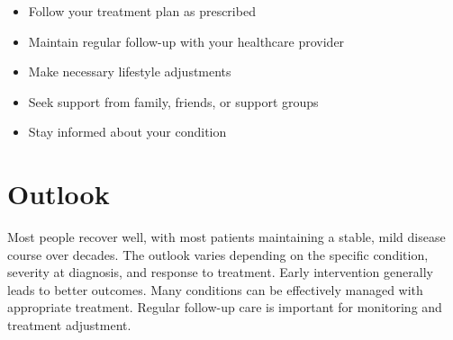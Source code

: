 \begin{itemize}[noitemsep]
  \item Follow your treatment plan as prescribed
  \item Maintain regular follow-up with your healthcare provider
  \item Make necessary lifestyle adjustments
  \item Seek support from family, friends, or support groups
  \item Stay informed about your condition
\end{itemize}
\section{Outlook}
Most people recover well, with most patients maintaining a stable, mild disease course over decades. The outlook varies depending on the specific condition, severity at diagnosis, and response to treatment. Early intervention generally leads to better outcomes. Many conditions can be effectively managed with appropriate treatment. Regular follow-up care is important for monitoring and treatment adjustment.
